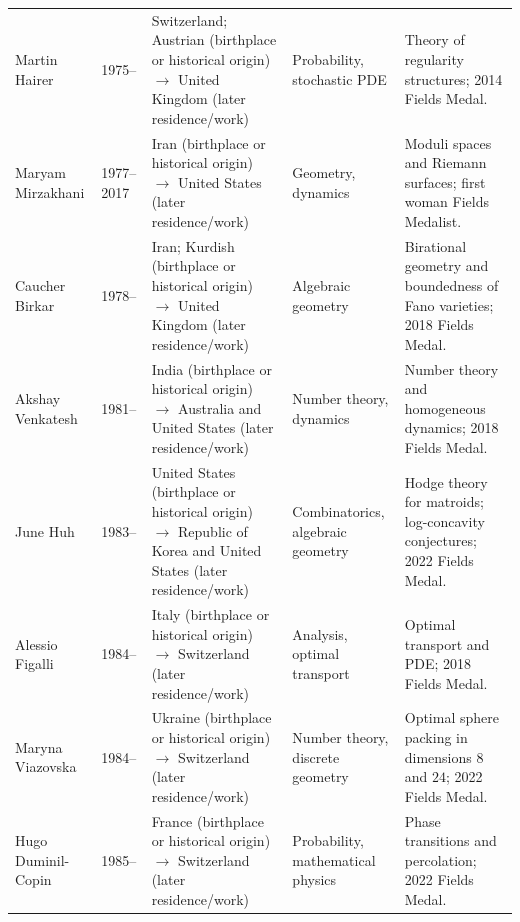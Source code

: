 {\begin{longtable}{@{}L{0.145\textwidth}L{0.09\textwidth}L{0.225\textwidth}L{0.14\textwidth}L{0.30\textwidth}@{}}
        Martin Hairer
        & 1975--
        & Switzerland; Austrian (birthplace or historical origin) \(\to\) United Kingdom (later residence/work)
        & Probability, stochastic PDE
        & Theory of regularity structures; 2014 Fields Medal. \\

        Maryam Mirzakhani
        & 1977--2017
        & Iran (birthplace or historical origin) \(\to\) United States (later residence/work)
        & Geometry, dynamics
        & Moduli spaces and Riemann surfaces; first woman Fields Medalist. \\

        Caucher Birkar
        & 1978--
        & Iran; Kurdish (birthplace or historical origin) \(\to\) United Kingdom (later residence/work)
        & Algebraic geometry
        & Birational geometry and boundedness of Fano varieties; 2018 Fields
          Medal. \\

        Akshay Venkatesh
        & 1981--
        & India (birthplace or historical origin) \(\to\) Australia and United States (later residence/work)
        & Number theory, dynamics
        & Number theory and homogeneous dynamics; 2018 Fields Medal. \\

        June Huh
        & 1983--
        & United States (birthplace or historical origin) \(\to\) Republic of Korea and United States (later residence/work)
        & Combinatorics, algebraic geometry
        & Hodge theory for matroids; log-concavity conjectures; 2022 Fields
          Medal. \\

        Alessio Figalli
        & 1984--
        & Italy (birthplace or historical origin) \(\to\) Switzerland (later residence/work)
        & Analysis, optimal transport
        & Optimal transport and PDE; 2018 Fields Medal. \\

        Maryna Viazovska
        & 1984--
        & Ukraine (birthplace or historical origin) \(\to\) Switzerland (later residence/work)
        & Number theory, discrete geometry
        & Optimal sphere packing in dimensions $8$ and $24$; 2022 Fields
          Medal. \\

        Hugo Duminil-Copin
        & 1985--
        & France (birthplace or historical origin) \(\to\) Switzerland (later residence/work)
        & Probability, mathematical physics
        & Phase transitions and percolation; 2022 Fields Medal. \\


\end{longtable}}
